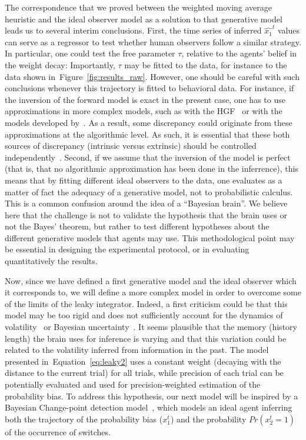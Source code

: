 \documentclass[12pt,english]{article}%
\newcommand{\citep}[1]{\parencite{#1}}
\newcommand{\citet}[1]{\textcite{#1}}
\newcommand{\seeFig}[1]{Figure~\ref{fig:#1}}
\newcommand{\seeEq}[1]{Equation~\ref{eq:#1}}
\begin{document}
The correspondence that we proved between the weighted moving average heuristic
and the ideal observer model as a solution to that generative model leads
us to several interim conclusions.
First, the time series of inferred $\hat{x_1}^{t}$ values can serve as a regressor
to test whether human observers follow a similar strategy.
In particular, one could test the free parameter $\tau$,
relative to the agents' belief in the weight decay:
Importantly, $\tau$ may be fitted to the data,
for instance to the data shown in~\seeFig{results_raw}.
However, one should be careful with such conclusions whenever
this trajectory is fitted to behavioral data.
For instance, if the inversion of the forward model is exact in the present case,
one has to use approximations in more complex models,
such as with the HGF~\citep{Mathys11}
or with the models developed by~\citet{Wilson13,Wilson18}.
As a result, some discrepancy could originate from these approximations
at the algorithmic level.
As such, it is essential that these both sources of discrepancy (intrinsic versus extrinsic)
should be controlled independently~\citep{Beck12}.
Second, if we assume that the inversion of the model is perfect
(that is, that no algorithmic approximation has been done in the inferrence),
this means that by fitting different ideal observers
to the data, one evaluates as a matter of fact the adequacy of
a generative model, not to probabilistic calculus.
This is a common confusion around the idea of a ``Bayesian brain''.
We believe here that the challenge is not to validate the hypothesis that the brain uses or not the Bayes' theorem,
but rather to test different hypotheses
about the different generative models
that agents may use.
This methodological point may be essential in designing the experimental protocol,
or in evaluating quantitatively the results.

Now, since we have defined a first generative model
and the ideal observer which it corresponds to,
we will define a more complex model
in order to overcome some of the limits of the leaky integrator.
Indeed, a first criticism could be that
this model may be too rigid and does not sufficiently
account for the dynamics of volatility~\citep{Behrens07}
or Bayesian uncertainty~\citep{Vilares2011}.
It seems plausible that the memory (history length) the brain uses
for inference is varying and that this variation could be related
to the volatility inferred from information in the past.
The model presented in~\seeEq{leaky2} uses a constant weight
(decaying with the distance to the current trial)
for all trials, while precision of each trial
can be potentially evaluated and used
for precision-weighted estimation of the probability bias.
To address this hypothesis, our next model will be inspired
by a Bayesian Change-point detection model~\citep{AdamsMackay2007},
which models an ideal agent inferring
both the trajectory of the probability bias ($x_1^t$)
and the probability $Pr(x_2^t=1)$ of the occurrence of switches.
\end{document}
